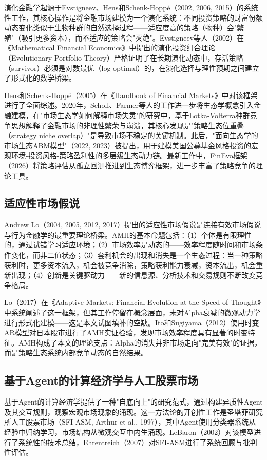演化金融学起源于Evstigneev、Hens和Schenk-Hoppé（2002, 2006, 2015）的系统性工作，其核心操作是将金融市场建模为一个演化系统：不同投资策略的财富份额动态变化类似于生物种群的自然选择过程——适应度高的策略（物种）会"繁殖"（吸引更多资本），而不适应的策略会"灭绝"。Evstigneev等人（2002）在《Mathematical Financial Economics》中提出的演化投资组合理论（Evolutionary Portfolio Theory）严格证明了在长期演化动态中，存活策略（survivor）必须是对数最优（log-optimal）的，在演化选择与理性预期之间建立了形式化的数学桥梁。

Hens和Schenk-Hoppé（2005）在《Handbook of Financial Markets》中对该框架进行了全面综述。2020年，Scholl、Farmer等人的工作进一步将生态学概念引入金融建模，在"市场生态学如何解释市场失灵"的研究中，基于Lotka-Volterra种群竞争思想解释了金融市场的非理性繁荣与崩溃，其核心发现是"策略生态位重叠（strategy niche overlap）"是导致市场不稳定的关键机制。此后，"面向生态学的市场生态ABM模型"（2022, 2023）被提出，用于建模美国公募基金风格投资的宏观环境-投资风格-策略盈利性的多层级生态动力链。最新工作中，FinEvo框架（2026）将策略评估从孤立回测推进到生态博弈框架，进一步丰富了策略竞争的理论工具。

\subsection{适应性市场假说}

Andrew Lo（2004, 2005, 2012, 2017）提出的适应性市场假说是连接有效市场假说与行为金融学的最重要理论桥梁。AMH的基本命题包括：（1）个体是有限理性的，通过试错学习适应环境；（2）市场效率是动态的——效率程度随时间和市场条件变化，而非二值状态；（3）套利机会的出现和消失是一个生态过程：当一种策略获利时，更多资本流入，机会被竞争消除，策略获利能力衰减，资本流出，机会重新出现；（4）创新是关键驱动力——新的信息源、分析技术和交易规则不断改变竞争格局。

Lo（2017）在《Adaptive Markets: Financial Evolution at the Speed of Thought》中系统阐述了这一框架，但其工作停留在概念层面，未对Alpha衰减的微观动力学进行形式化建模——这是本文试图填补的空缺。Ito和Sugiyama（2012）使用时变AR模型对日本股市进行了AMH实证检验，发现市场效率程度具有显著的时变特征。AMH构成了本文的理论支点：Alpha的消失并非市场走向"完美有效"的证据，而是策略生态系统内部竞争动态的自然结果。

\subsection{基于Agent的计算经济学与人工股票市场}

基于Agent的计算经济学提供了一种"自底向上"的研究范式，通过构建异质性Agent及其交互规则，观察宏观市场现象的涌现。这一方法论的开创性工作是圣塔菲研究所人工股票市场（SFI-ASM, Arthur et al., 1997），其中Agent使用分类器系统从经验中归纳学习，市场结构从微观交互中内生涌现。LeBaron（2002）对该模型进行了系统性的技术总结，Ehrentreich（2007）对SFI-ASM进行了系统回顾与批判性评估。

